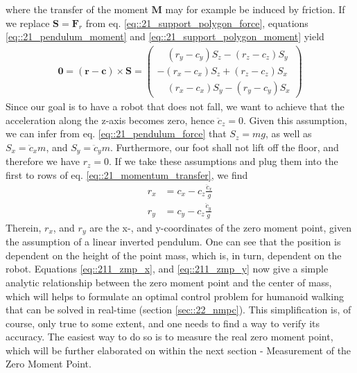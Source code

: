 where the transfer of the moment $\bm{M}$ may for example be induced by friction. If we replace $\bm{S}=\bm{F}_r$ from eq. \ref{eq::21_support_polygon_force}, equations \ref{eq::21_pendulum_moment} and \ref{eq::21_support_polygon_moment} yield 
\begin{align}
	\bm{0} = (\bm{r}-\bm{c})\times\bm{S} = \begin{pmatrix}
	\quad(r_y - c_y)S_z - (r_z - c_z)S_y \\
	-(r_x - c_x)S_z + (r_z - c_z)S_x \\
	\quad(r_x - c_x)S_y - (r_y - c_y)S_x
	\end{pmatrix}
	\label{eq::21_momentum_transfer}
\end{align}
Since our goal is to have a robot that does not fall, we want to achieve that the acceleration along the z-axis becomes zero, hence $\ddot{c}_z=0$. Given this assumption, we can infer from eq. \ref{eq::21_pendulum_force} that $S_z=mg$, as well as $S_x = \ddot{c}_xm$, and $S_y = \ddot{c}_ym$. Furthermore, our foot shall not lift off the floor, and therefore we have $r_z=0$. If we take these assumptions and plug them into the first to rows of eq. \ref{eq::21_momentum_transfer}, we find
\begin{align}
	r_x &= c_x - c_z\frac{\ddot{c}_x}{g}
	\label{eq::211_zmp_x}\\
	r_y &= c_y - c_z\frac{\ddot{c}_y}{g}
	\label{eq::211_zmp_y}
\end{align}
Therein, $r_x$, and $r_y$ are the x-, and y-coordinates of the zero moment point, given the assumption of a linear inverted pendulum. One can see that the position is dependent on the height of the point mass, which is, in turn, dependent on the robot. Equations \ref{eq::211_zmp_x}, and \ref{eq::211_zmp_y} now give a simple analytic relationship between the zero moment point and the center of mass, which will helps to formulate an optimal control problem for humanoid walking that can be solved in real-time (section \ref{sec::22_nmpc}). This simplification is, of course, only true to some extent, and one needs to find a way to verify its accuracy. The easiest way to do so is to measure the real zero moment point, which will be further elaborated on within the next section - Measurement of the Zero Moment Point.
\FloatBarrier
